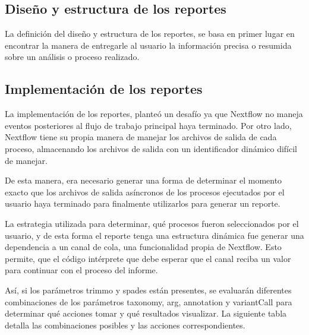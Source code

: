 \documentclass[12pt]{article}
\begin{document}
\subsection{Diseño y estructura de los reportes}

La definición del diseño y estructura de los 
reportes, se basa en primer lugar en encontrar 
la manera de entregarle al usuario la información 
precisa o resumida sobre un análisis o proceso 
realizado.

\subsection{Implementación de los reportes}

La implementación de los reportes, planteó un desafío ya que Nextflow 
no maneja eventos posteriores al  flujo de trabajo principal haya terminado. 
Por otro lado, Nextflow tiene su propia manera de manejar los archivos de 
salida de cada proceso, almacenando los archivos de salida con un 
identificador dinámico difícil de manejar.

De esta manera, era necesario generar una forma de determinar el 
momento exacto que los archivos de salida asíncronos de los procesos 
ejecutados por el usuario haya terminado para finalmente utilizarlos para 
generar un reporte.

La estrategia utilizada para determinar, qué procesos fueron 
seleccionados por el usuario, y de esta forma el reporte tenga 
una estructura dinámica fue generar una dependencia a un canal de 
cola, una funcionalidad propia de Nextflow. Esto permite, que el 
código intérprete que debe esperar que el canal reciba un valor para 
continuar con el proceso del informe.

Así, si los parámetros trimmo y spades están presentes, se evaluarán 
diferentes combinaciones de los parámetros taxonomy, arg, annotation y 
variantCall para determinar qué acciones tomar y qué resultados visualizar.
La siguiente tabla detalla las combinaciones posibles y las acciones 
correspondientes. 
\end{document}
